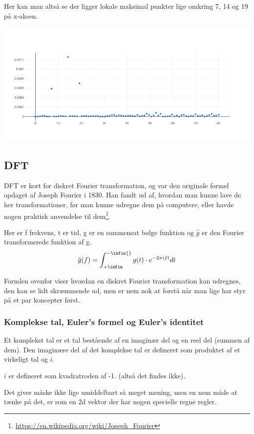 \documentclass[11pt,a4paper]{article}
\begin{document}
Her kan man altså se der ligger lokale maksimal punkter lige omkring 7, 14 og 19 på x-aksen.
\begin{center}
\includegraphics[width=.9\linewidth]{./plot2.png}
\end{center}

\bigskip

\subsection{DFT}
\label{sec:org35ab26c}
DFT er kort for diskret Fourier transformation, og var den originale formel opdaget af Joseph Fourier i 1830.
Han fandt ud af, hvordan man kunne lave de her transformationer, før man kunne udregne dem på computere,
eller havde nogen praktisk anvendelse til dem\footnote{\url{https://en.wikipedia.org/wiki/Joseph\_Fourier}}.

Her er f frekvens, t er tid, g er en sammensat bølge funktion og \(\hat{g}\) er den Fourier transformerede funktion af g.
$$
\hat{g}(f) = \int_{+\infin}^{-\infin{}} g(t) \cdot e ^{-2\pi ift}dt
$$

Formlen ovenfor viser hvordan en diskret Fourier transformation kan udregnes,
den kan se lidt skræmmende ud, men er nem nok at forstå når man lige har styr på et par koncepter først.

\bigskip

\subsubsection{Komplekse tal, Euler's formel og Euler's identitet}
\label{sec:org349558b}

Et komplekst tal er et tal bestående af en imaginær del og en reel del (summen af dem).
Den imaginære del af det komplekse tal er defineret som produktet af et
virkeligt tal og \(i\).

\(i\) er defineret som kvadratroden af -1. (altså det findes ikke).

Det giver måske ikke lige umiddelbart så meget mening, men en nem måde at tænke på det,
er som en 2d vektor der har nogen specielle regne regler.
\end{document}
